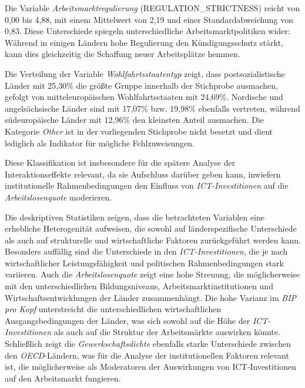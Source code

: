 Die Variable \textit{Arbeitsmarktregulierung} (REGULATION\_STRICTNESS) reicht von 0,00 bis 
4,88, mit einem Mittelwert von 2,19 und einer Standardabweichung von 0,83. Diese Unterschiede 
spiegeln unterschiedliche Arbeitsmarktpolitiken wider: Während in einigen Ländern hohe 
Regulierung den Kündigungsschutz stärkt, kann dies gleichzeitig die Schaffung neuer 
Arbeitsplätze hemmen.



Die Verteilung der Variable \textit{Wohlfahrtsstaatentyp} zeigt, dass postsozialistische 
Länder mit 25,30\% die größte Gruppe innerhalb der Stichprobe ausmachen, gefolgt von 
mitteleuropäischen Wohlfahrtsstaaten mit 24,69\%. Nordische und angelsächsische 
Länder sind mit 17,07\% bzw. 19,98\% ebenfalls vertreten, während südeuropäische 
Länder mit 12,96\% den kleinsten Anteil ausmachen. Die Kategorie \textit{Other} ist 
in der vorliegenden Stichprobe nicht besetzt und dient lediglich als Indikator für mögliche 
Fehlzuweisungen.

Diese Klassifikation ist insbesondere für die spätere Analyse der Interaktionseffekte 
relevant, da sie Aufschluss darüber geben kann, inwiefern institutionelle 
Rahmenbedingungen den Einfluss von \textit{\ac{ICT}-Investitionen} auf die 
\textit{Arbeitslosenquote} moderieren.

Die deskriptiven Statistiken zeigen, dass die betrachteten Variablen eine erhebliche 
Heterogenität aufweisen, die sowohl auf länderspezifische Unterschiede als auch auf 
strukturelle und wirtschaftliche Faktoren zurückgeführt werden kann. Besonders auffällig 
sind die Unterschiede in den \textit{\ac{ICT}-Investitionen}, die je nach wirtschaftlicher 
Leistungsfähigkeit und politischen Rahmenbedingungen stark variieren. Auch die 
\textit{Arbeitslosenquote} zeigt eine hohe Streuung, die möglicherweise mit den 
unterschiedlichen Bildungsniveaus, Arbeitsmarktinstitutionen und Wirtschaftsentwicklungen 
der Länder zusammenhängt. Die hohe Varianz im \textit{\ac{BIP} pro Kopf} unterstreicht die 
unterschiedlichen wirtschaftlichen Ausgangsbedingungen der Länder, was sich sowohl auf die 
Höhe der \textit{\ac{ICT}-Investitionen} als auch auf die Struktur der Arbeitsmärkte 
auswirken könnte. Schließlich zeigt die \textit{Gewerkschaftsdichte} ebenfalls starke 
Unterschiede zwischen den \textit{OECD}-Ländern, was für die Analyse der institutionellen 
Faktoren relevant ist, die möglicherweise als Moderatoren der Auswirkungen von 
\ac{ICT}-Investitionen auf den Arbeitsmarkt fungieren.

